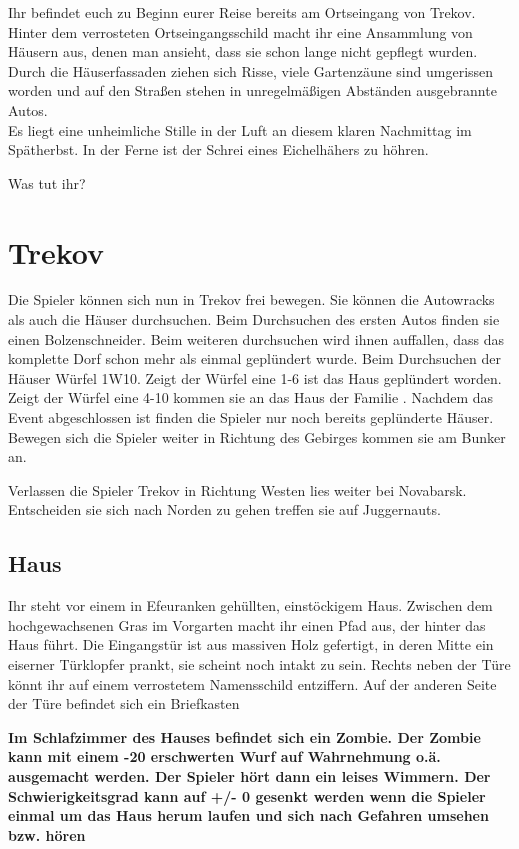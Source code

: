 \documentclass{include/protokollclass}
\begin{document}
Ihr befindet euch zu Beginn eurer Reise bereits am Ortseingang von Trekov. Hinter dem verrosteten Ortseingangsschild macht ihr eine Ansammlung von Häusern aus, denen man ansieht, dass sie schon lange nicht gepflegt wurden.
\\Durch die Häuserfassaden ziehen sich Risse, viele Gartenzäune sind umgerissen worden und auf den Straßen stehen in unregelmäßigen Abständen ausgebrannte Autos.
\\Es liegt eine unheimliche Stille in der Luft an diesem klaren Nachmittag im Spätherbst. In der Ferne ist der Schrei eines Eichelhähers zu höhren.

Was tut ihr?

\section{Trekov}

Die Spieler können sich nun in Trekov frei bewegen. Sie können die Autowracks als auch die Häuser durchsuchen. Beim Durchsuchen des ersten Autos finden sie einen Bolzenschneider. Beim weiteren durchsuchen wird ihnen auffallen, dass das komplette Dorf schon mehr als einmal geplündert wurde. Beim Durchsuchen der Häuser Würfel 1W10. Zeigt der Würfel eine 1-6 ist das Haus geplündert worden.
\\Zeigt der Würfel eine 4-10 kommen sie an das Haus der Familie . Nachdem das Event abgeschlossen ist finden die Spieler nur noch bereits geplünderte Häuser. Bewegen sich die Spieler weiter in Richtung des Gebirges kommen sie am Bunker an.

Verlassen die Spieler Trekov in Richtung Westen lies weiter bei Novabarsk. Entscheiden sie sich nach Norden zu gehen treffen sie auf Juggernauts. 

\subsection{Haus}

Ihr steht vor einem in Efeuranken gehüllten, einstöckigem Haus. Zwischen dem hochgewachsenen Gras im Vorgarten macht ihr einen Pfad aus, der hinter das Haus führt. Die Eingangstür ist aus massiven Holz gefertigt, in deren Mitte ein eiserner Türklopfer prankt, sie scheint noch intakt zu sein. Rechts neben der Türe könnt ihr auf einem verrostetem Namensschild  entziffern. Auf der anderen Seite der Türe befindet sich ein Briefkasten

\textbf{Im Schlafzimmer des Hauses befindet sich ein Zombie. Der Zombie kann mit einem -20 erschwerten Wurf auf Wahrnehmung o.ä. ausgemacht werden. Der Spieler hört dann ein leises Wimmern. Der Schwierigkeitsgrad kann auf +/- 0 gesenkt werden wenn die Spieler einmal um das Haus herum laufen und sich nach Gefahren umsehen bzw. hören}
\end{document}
